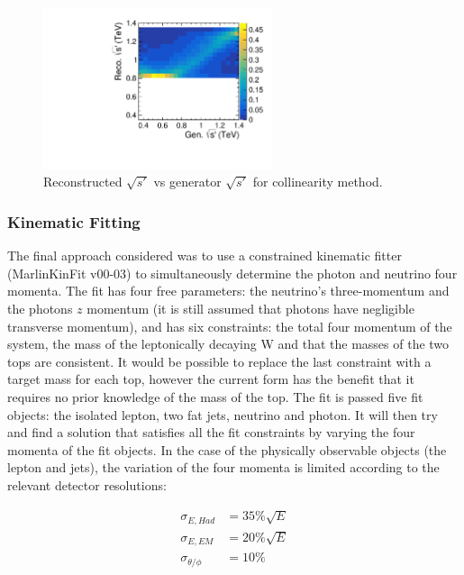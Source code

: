 \begin{figure}
  \centering
  \includegraphics[width=0.6\textwidth]{TopAnalysis/figures/ColEVsTrueE.pdf}
  \caption[Reconstructed $\sqrt{s'}$ vs generator $\sqrt{s'}$ for collinearity method]{Reconstructed $\sqrt{s'}$ vs generator $\sqrt{s'}$ for collinearity method.}
  \label{fig:CollinearitySPrime}
\end{figure}

\subsubsection{Kinematic Fitting}

The final approach considered was to use a constrained kinematic fitter (MarlinKinFit v00-03\cite{List:88030}) to simultaneously determine the photon and  neutrino four momenta. The fit has four free parameters: the neutrino's three-momentum and the photons $z$ momentum (it is still assumed that photons have negligible transverse momentum), and has six constraints: the total four momentum of the system, the mass of the leptonically decaying W and that the masses of the two tops are consistent. It would be possible to replace the last constraint with a target mass for each top, however the current form has the benefit that it requires no prior knowledge of the mass of the top. The fit is passed five fit objects: the isolated lepton, two fat jets, neutrino and photon.  It will then try and find a solution that satisfies all the fit constraints by varying the four momenta of the fit objects. In the case of the physically observable objects (the lepton and jets), the variation of the four momenta is limited according to the relevant detector resolutions:

\begin{align}
  \sigma_{E, Had}&=35\%\sqrt{E}
  \\
  \sigma_{E, EM}&=20\%\sqrt{E}
\\
  \sigma_{\theta/\phi}&=10\%
\end{align}

